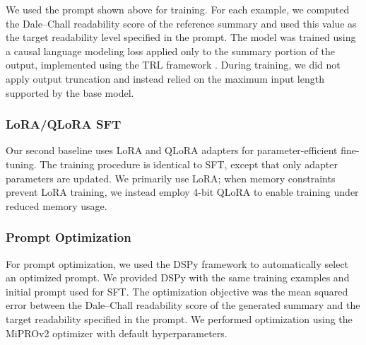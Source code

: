 \label{baseline_prompt}

We used the prompt shown above for training. For each example, we computed the Dale--Chall readability score of the reference summary and used this value as the target readability level specified in the prompt. The model was trained using a causal language modeling loss applied only to the summary portion of the output, implemented using the TRL framework \cite{vonwerra2022trl}. During training, we did not apply output truncation and instead relied on the maximum input length supported by the base model.

\subsubsection{LoRA/QLoRA SFT}
Our second baseline uses LoRA and QLoRA adapters for parameter-efficient fine-tuning. The training procedure is identical to SFT, except that only adapter parameters are updated. We primarily use LoRA; when memory constraints prevent LoRA training, we instead employ 4-bit QLoRA to enable training under reduced memory usage.

\subsubsection{Prompt Optimization}
For prompt optimization, we used the DSPy \cite{khattab2023dspycompilingdeclarativelanguage} framework to automatically select an optimized prompt. We provided DSPy with the same training examples and initial prompt used for SFT. The optimization objective was the mean squared error between the Dale--Chall readability score of the generated summary and the target readability specified in the prompt. We performed optimization using the MiPROv2 \cite{opsahlong2024optimizinginstructionsdemonstrationsmultistage} optimizer with default hyperparameters.



